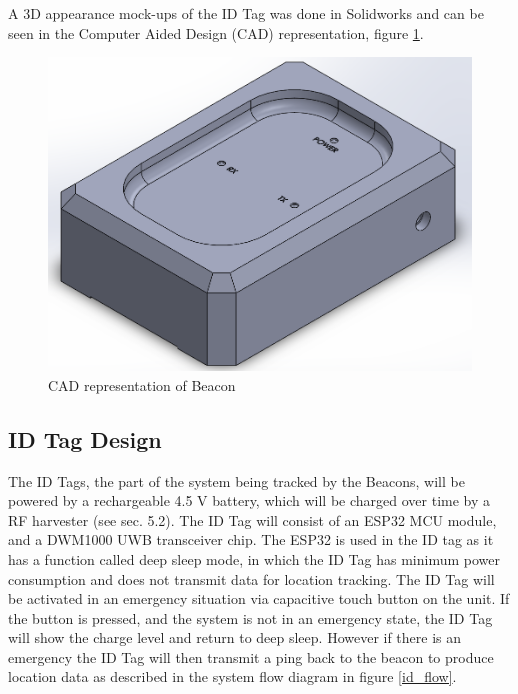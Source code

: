 A 3D appearance mock-ups of the ID Tag was done in Solidworks and can be seen in the Computer Aided Design (CAD) representation, figure \ref{Bcn_CAD}. 

\medskip
\begin{figure}[H]
\centering
    \includegraphics[scale=0.40]{./images/Beacon.png}
    \caption{CAD representation of Beacon}
    \label{Bcn_CAD}
\end{figure}



\pagebreak
\subsection{ID Tag Design}
The ID Tags, the part of the system being tracked by the Beacons, will be powered by a rechargeable 4.5 V battery, which will be charged over time by a RF harvester (see sec. 5.2). The ID Tag will consist of an ESP32 MCU module, and a DWM1000 UWB transceiver chip. The ESP32 is used in the ID tag as it has a function called deep sleep mode, in which the ID Tag has minimum power consumption and does not transmit data for  location tracking. The ID Tag will be activated in an emergency situation via capacitive touch button on the unit. If the button is pressed, and the system is not in an emergency state, the ID Tag will show the charge level and return to deep sleep. However if there is an emergency the ID Tag will then transmit a ping back to the beacon to produce location data as described in the system flow diagram in figure \ref{id_flow}. 

